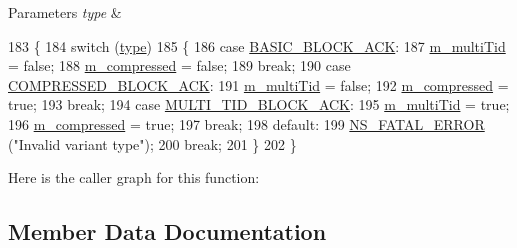 \begin{DoxyParams}{Parameters}
{\em type} & \\
\hline
\end{DoxyParams}

\begin{DoxyCode}
183 \{
184   \textcolor{keywordflow}{switch} (\hyperlink{visualizer-ideas_8txt_add98db9e15e2a58cf2b57623e7aa893a}{type})
185     \{
186     \textcolor{keywordflow}{case} \hyperlink{namespacens3_a90f436472d19d7d7f37cbf0b8c288ff7a118b16b614e89a911b77a167632f89bf}{BASIC\_BLOCK\_ACK}:
187       \hyperlink{classns3_1_1CtrlBAckRequestHeader_abc49ee1894e62986dcbcf98af884a794}{m\_multiTid} = \textcolor{keyword}{false};
188       \hyperlink{classns3_1_1CtrlBAckRequestHeader_ad4f7ec69067c22a0008aaf4ed8dac81c}{m\_compressed} = \textcolor{keyword}{false};
189       \textcolor{keywordflow}{break};
190     \textcolor{keywordflow}{case} \hyperlink{namespacens3_a90f436472d19d7d7f37cbf0b8c288ff7ad325114ff6e0d84c1d4cea5bd810a48c}{COMPRESSED\_BLOCK\_ACK}:
191       \hyperlink{classns3_1_1CtrlBAckRequestHeader_abc49ee1894e62986dcbcf98af884a794}{m\_multiTid} = \textcolor{keyword}{false};
192       \hyperlink{classns3_1_1CtrlBAckRequestHeader_ad4f7ec69067c22a0008aaf4ed8dac81c}{m\_compressed} = \textcolor{keyword}{true};
193       \textcolor{keywordflow}{break};
194     \textcolor{keywordflow}{case} \hyperlink{namespacens3_a90f436472d19d7d7f37cbf0b8c288ff7a2b0db78cd77aa4769690b7b6aac6f017}{MULTI\_TID\_BLOCK\_ACK}:
195       \hyperlink{classns3_1_1CtrlBAckRequestHeader_abc49ee1894e62986dcbcf98af884a794}{m\_multiTid} = \textcolor{keyword}{true};
196       \hyperlink{classns3_1_1CtrlBAckRequestHeader_ad4f7ec69067c22a0008aaf4ed8dac81c}{m\_compressed} = \textcolor{keyword}{true};
197       \textcolor{keywordflow}{break};
198     \textcolor{keywordflow}{default}:
199       \hyperlink{group__fatal_ga5131d5e3f75d7d4cbfd706ac456fdc85}{NS\_FATAL\_ERROR} (\textcolor{stringliteral}{"Invalid variant type"});
200       \textcolor{keywordflow}{break};
201     \}
202 \}
\end{DoxyCode}


Here is the caller graph for this function\+:




\subsection{Member Data Documentation}
